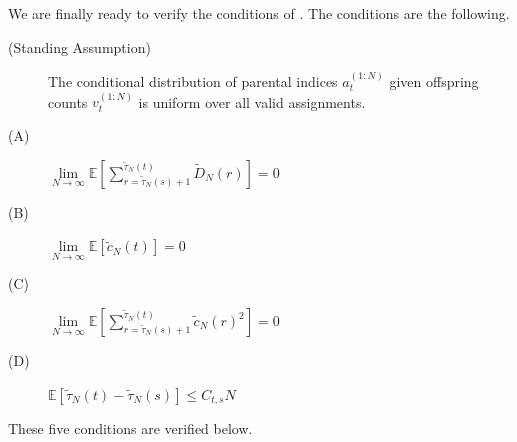 \documentclass[fleqn]{article}
\theoremstyle{definition}
\newcommand{\E}{\mathbb{E}}
\newcommand{\limNtoinfty}{\underset{N\to\infty}{\lim}}
\begin{document}
We are finally ready to verify the conditions of \citet[Theorem 1]{koskela2018}. The conditions are the following.
\begin{description}
\item[(Standing Assumption)] The conditional distribution of parental indices $a_t^{(1:N)}$ given offspring counts $v_t^{(1:N)}$ is uniform over all valid assignments.
\item[(A)] $\limNtoinfty \E\left[ \sum_{r=\tilde{\tau}_N(s)+1}^{\tilde{\tau}_N(t)} \tilde{D}_N(r) \right] =0$
\item[(B)] $\limNtoinfty \E[\tilde{c}_N(t)] =0$
\item[(C)] $\limNtoinfty \E\left[ \sum_{r=\tilde{\tau}_N(s)+1}^{\tilde{\tau}_N(t)} \tilde{c}_N(r)^2 \right] =0$
\item[(D)] $\E[\tilde{\tau}_N(t) - \tilde{\tau}_N(s)] \leq C_{t,s}N$
\end{description}
These five conditions are verified below.
\end{document}
